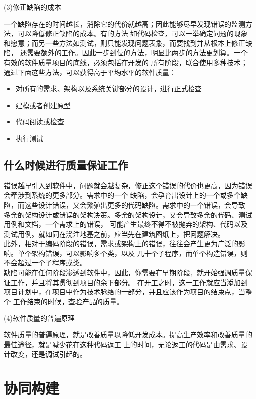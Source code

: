 \documentclass{article}
\begin{document}
\par
(3)修正缺陷的成本
\par
一个缺陷存在的时间越长，消除它的代价就越高；因此能够尽早发现错误的监测方法，可以降低修正缺陷的成本。有的方法
如代码检查，可以一举确定问题的现象和愿意；而另一些方法如测试，则只能发现问题表象，而要找到并从根本上修正缺陷，
还需要额外的工作。因此一步到位的方法，明显比两步的方法更划算。一个有效的软件质量项目的底线，必须包括在开发的
所有阶段，联合使用多种技术；通过下面这些方法，可以获得高于平均水平的软件质量：
\begin{itemize}
    \item 对所有的需求、架构以及系统关键部分的设计，进行正式检查
    \item 建模或者创建原型
    \item 代码阅读或检查
    \item 执行测试
\end{itemize}

\subsection{什么时候进行质量保证工作}
错误越早引入到软件中，问题就会越复杂，修正这个错误的代价也更高，因为错误会牵涉到系统的更多部分。需求中的一个
缺陷，会孕育出设计上的一个或多个缺陷，而这些设计错误，又会繁殖出更多的代码缺陷。需求中的一个错误，会导致
多余的架构设计或错误的架构决策。多余的架构设计，又会导致多余的代码、测试用例和文档，一个需求上的错误，
可能产生最终不得不被抛弃的架构、代码以及测试用例。就如同在浇注地基之前，应当先在建筑图纸上，把问题解决。\\
此外，相对于编码阶段的错误，需求或架构上的错误，往往会产生更为广泛的影响。单个架构错误，可以影响多个类，以及
几十个子程序，而单个构造错误，则不会超过一个子程序或类。\\
缺陷可能在任何阶段渗透到软件中，因此，你需要在早期阶段，就开始强调质量保证工作，并且将其贯彻到项目的余下部分。
在开工之时，这一工作就应当添加到项目计划中，在项目中作为技术脉络的一部分，并且应该作为项目的结束点，当整个
工作结束的时候，查验产品的质量。

\par
(4)软件质量的普遍原理
\par
软件质量的普遍原理，就是改善质量以降低开发成本。提高生产效率和改善质量的最佳途径，就是减少花在这种代码返工
上的时间，无论返工的代码是由需求、设计改变，还是调试引起的。

\section{协同构建}
\end{document}
